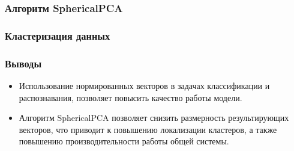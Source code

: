 \documentclass{beamer}
\begin{document}
\begin{frame}
\frametitle{Алгоритм SphericalPCA}

\end{frame}

\begin{frame}
\frametitle{Кластеризация данных}

\end{frame}

\begin{frame}
\frametitle{Выводы}
\begin{itemize}
\item Использование нормированных векторов в задачах классификации и распознавания, позволяет повысить качество работы модели.
\item Алгоритм SphericalPCA позволяет снизить размерность результирующих векторов, что приводит к повышению локализации кластеров, а также повышению производительности работы общей системы.
\end{itemize}

\end{frame}
\end{document}
